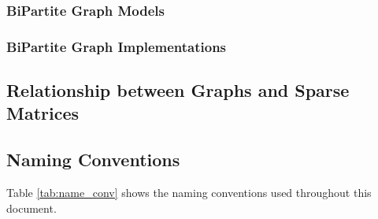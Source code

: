 

\subsubsection{BiPartite Graph Models}


\subsubsection{BiPartite Graph Implementations}


\subsection{Relationship between Graphs and Sparse Matrices}



\subsection{Naming Conventions}


Table \ref{tab:name_conv} shows the naming conventions used throughout this document. 


